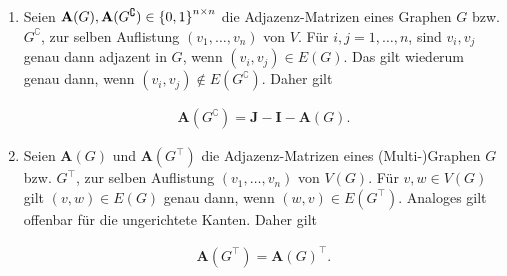\begin{remark}
\begin{enumerate}[
                label = \texttt{ad} \arabic*.,
                wide,
                labelindent = 0pt
            ]
                \begin{align*}
                    \mathbf A(\bar G) = \mathbf A(G) + \mathbf A(G)^\top.
                \end{align*}

                Es sei abermals daran erinnert, dass das Summieren der Diagonalen zweckgemäß ist, da ungerichtete Schleifen doppelt zur Adjazenz beitragen.

                \item Seien $\mathbf A(G), \mathbf A(G^\complement) \in {\left \{ 0, 1 \right \}}^{n \times n}$ die Adjazenz-Matrizen eines Graphen $G$ bzw. $G^\complement$, zur selben Auflistung $(v_1, \dots, v_n)$ von $V$.
                Für $i, j = 1, \dots, n$, sind $v_i, v_j$ genau dann adjazent in $G$, wenn $(v_i, v_j) \in E(G)$.
                Das gilt wiederum genau dann, wenn $(v_i, v_j) \not \in E(G^\complement)$.
                Daher gilt

                \begin{align*}
                    \mathbf A(G^\complement) = \mathbf J - \mathbf I - \mathbf A(G).
                \end{align*}

                \item Seien $\mathbf A(G)$ und $\mathbf A(G^\top)$ die Adjazenz-Matrizen eines (Multi-)Graphen $G$ bzw. $G^\top$, zur selben Auflistung $(v_1, \dots, v_n)$ von $V(G)$.
                Für $v, w \in V(G)$ gilt $(v, w) \in E(G)$ genau dann, wenn $(w, v) \in E(G^\top)$.
                Analoges gilt offenbar für die ungerichtete Kanten.
                Daher gilt

                \begin{align*}
                    \mathbf A(G^\top) = \mathbf A(G)^\top.
                \end{align*}

            \end{enumerate}

        \end{remark}

